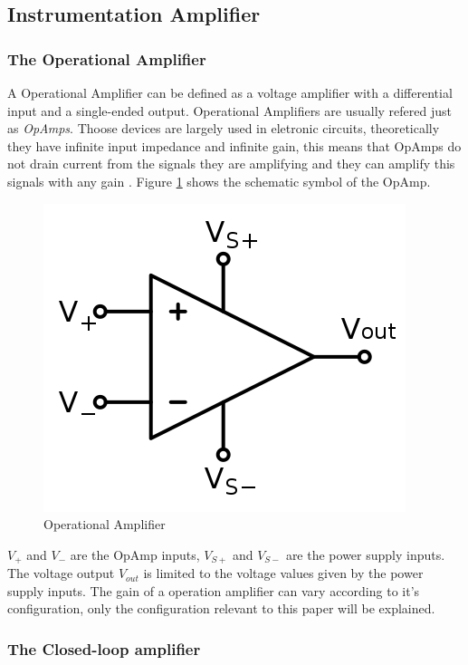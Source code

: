 \subsection{Instrumentation Amplifier}

	\subsubsection{The Operational Amplifier}

		A Operational Amplifier can be defined as a voltage amplifier with a differential input and a single-ended output. Operational Amplifiers are usually refered just as \textit{OpAmps}. Thoose devices are largely used in eletronic circuits, theoretically they have infinite input impedance and infinite gain, this means that OpAmps do not drain current from the signals they are amplifying and they can amplify this signals with any gain \cite{mancini2000understanding}. Figure \ref{fig-opamp} shows the schematic symbol of the OpAmp.

	\begin{figure}[htbp]
		\centering
			\includegraphics[scale=0.6]{figuras/fig-opamp.png}
		\caption{Operational Amplifier \cite{fig-opamp}}
		\label{fig-opamp}
	\end{figure}

	$V_{+}$ and $V_{-}$ are the OpAmp inputs, $V_{S+}$ and $V_{S-}$ are the power supply inputs. The voltage output $V_{out}$ is limited to the voltage values given by the power supply inputs. The gain of a operation amplifier can vary according to it's configuration, only the configuration relevant to this paper will be explained.

	\subsubsection{The Closed-loop amplifier}

